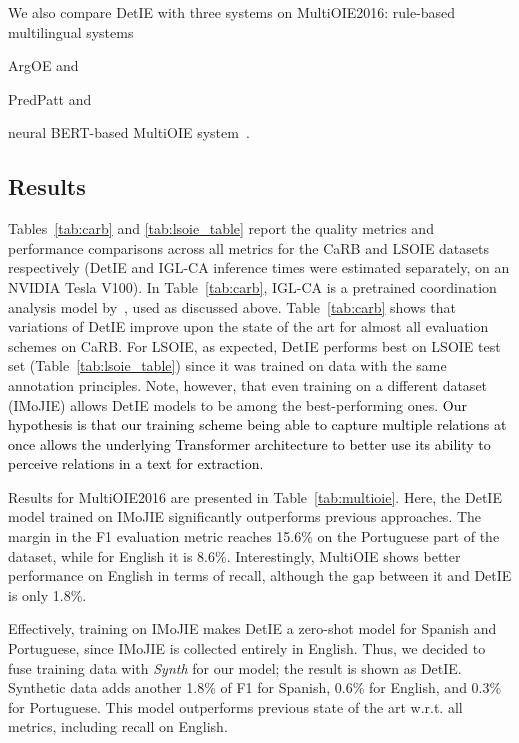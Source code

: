 \documentclass[letterpaper]{article} \usepackage{aaai22}  \usepackage{times}  \usepackage{helvet}  \usepackage{courier}  \usepackage[hyphens]{url}  \usepackage{graphicx} \usepackage{placeins}
\newcommand{\added}[1]{\textcolor{black}{#1}}
\begin{document}
We also compare DetIE with three systems on MultiOIE2016: rule-based multilingual systems
\begin{inparaenum}[(1)]
\item ArgOE \cite{gamallo2015multilingual} and 
\item PredPatt \cite{white2016universal} and
\item neural BERT-based MultiOIE system~\cite{ro2020multi}.
\end{inparaenum}

\subsection{Results}

Tables~\ref{tab:carb} and \ref{tab:lsoie_table} report the quality metrics and performance comparisons across all metrics for the CaRB and LSOIE datasets respectively (DetIE and IGL-CA inference times were estimated separately, on an NVIDIA Tesla V100).
In Table~\ref{tab:carb}, IGL-CA is a pretrained coordination analysis model by~\citet{kolluru2020openie6}, used as discussed above. Table~\ref{tab:carb} shows that variations of DetIE improve upon the state of the art for almost all evaluation schemes on CaRB. For LSOIE,
as expected, DetIE performs best on LSOIE test set (Table~\ref{tab:lsoie_table}) since it was trained on data with the same annotation principles. Note, however, that even training on a different dataset (IMoJIE) allows DetIE models to be among the best-performing ones. \added{Our hypothesis is that our training scheme being able to capture multiple relations at once allows the underlying Transformer architecture to better use its ability to perceive relations in a text for extraction.}

Results for MultiOIE2016 are presented in Table~\ref{tab:multioie}. Here, the DetIE model trained on IMoJIE significantly outperforms previous approaches. The margin in the F1 evaluation metric reaches 15.6\% on the Portuguese part of the dataset, while for English it is 8.6\%. Interestingly, MultiOIE shows better performance on English in terms of recall, although the gap between it and DetIE is only 1.8\%.

Effectively, training on IMoJIE makes DetIE a zero-shot model for Spanish and Portuguese, since IMoJIE is collected entirely in English. Thus, we decided to fuse training data with \emph{Synth} for our model; the result is shown as DetIE. Synthetic data adds another 1.8\% of F1 for Spanish, 0.6\% for English, and 0.3\% for Portuguese. This model outperforms previous state of the art w.r.t. all metrics, including recall on English.
\end{document}
